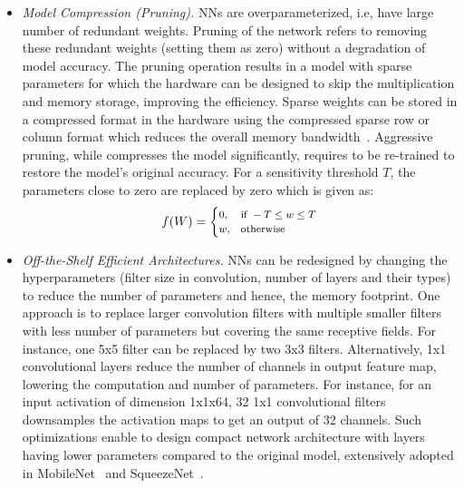 \begin{itemize}[leftmargin=*]
\item {\em Model Compression (Pruning).}
NNs are overparameterized, i.e, have large number of redundant weights.
Pruning of the network refers to removing these redundant weights (setting them as zero) without a degradation of model accuracy.
The pruning operation results in a model with sparse parameters for which the hardware can be designed to skip the multiplication and memory storage, improving the efficiency.
Sparse weights can be stored in a compressed format in the hardware using the compressed sparse row or column format which reduces the overall memory bandwidth~\cite{DBLP:journals/corr/HanMD15,10.1109/ISCA.2016.30,Han:2015:LBW:2969239.2969366}.
Aggressive pruning, while compresses the model significantly, requires to be re-trained to restore the model's original accuracy.
For a sensitivity threshold $T$, the parameters close to zero are replaced by zero which is given as:
\[
\footnotesize
    f(W)=
\begin{cases}
    0, & \text{if } -T \leq w \leq T\\
    w,  & \text{otherwise}
\end{cases}
\]

\item {\em Off-the-Shelf Efficient Architectures.}
NNs can be redesigned by changing the hyperparameters (filter size in convolution, number of layers and their types) to reduce the number of parameters and hence, the memory footprint.
One approach is to replace larger convolution filters with multiple smaller filters with less number of parameters but covering the same receptive fields.
For instance, one 5x5 filter can be replaced by two 3x3 filters.
Alternatively, 1x1 convolutional layers reduce the number of channels in output feature map, lowering the computation and number of parameters.
For instance, for an input activation of dimension 1x1x64, 32 1x1 convolutional filters downsamples the activation maps to get an output of 32 channels.
Such optimizations enable to design compact network architecture with layers having lower parameters compared to the original model, extensively adopted in MobileNet~\cite{conf/cvpr/SandlerHZZC18} and SqueezeNet~\cite{DBLP:journals/corr/IandolaMAHDK16}.



\end{itemize}
